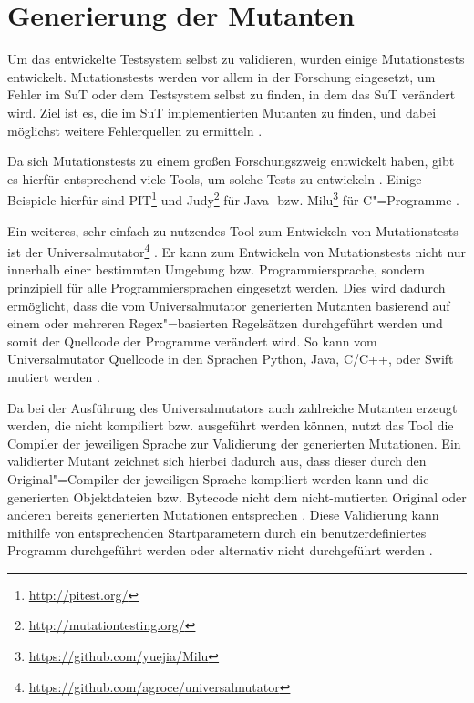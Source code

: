 \section{Generierung der Mutanten}
\label{sec:implMutationTests}

Um das entwickelte Testsystem selbst zu validieren, wurden einige Mutationstests entwickelt.
Mutationstests werden vor allem in der Forschung eingesetzt, um Fehler im \gls{SuT} oder dem Testsystem selbst zu finden, in dem das \gls{SuT} verändert wird.
Ziel ist es, die im \gls{SuT} implementierten Mutanten zu finden, und dabei möglichst weitere Fehlerquellen zu ermitteln \cite{DeMillo1978,Hamlet1977,Jia2011,Groce2018}.

Da sich Mutationstests zu einem großen Forschungszweig entwickelt haben, gibt es hierfür entsprechend viele Tools, um solche Tests zu entwickeln \cite{Jia2011,Groce2018}.
Einige Beispiele hierfür sind PIT\footnote{\url{http://pitest.org/}} und Judy\footnote{\url{http://mutationtesting.org/}} für Java- bzw. Milu\footnote{\url{https://github.com/yuejia/Milu}} für C"=Programme \cite{Coles2016,Madeyski2010,Jia2008}.

Ein weiteres, sehr einfach zu nutzendes Tool zum Entwickeln von Mutationstests ist der Universalmutator\footnote{\url{https://github.com/agroce/universalmutator}} \cite{Groce2018}.
Er kann zum Entwickeln von Mutationstests nicht nur innerhalb einer bestimmten Umgebung bzw. Programmiersprache, sondern prinzipiell für alle Programmiersprachen eingesetzt werden.
Dies wird dadurch ermöglicht, dass die vom Universalmutator generierten Mutanten basierend auf einem oder mehreren \gls{Regex}"=basierten Regelsätzen durchgeführt werden und somit der Quellcode der Programme verändert wird.
So kann vom Universalmutator Quellcode \uA in den Sprachen Python, Java, C/C++, oder Swift mutiert werden \cite{Groce2018}.

Da bei der Ausführung des Universalmutators auch zahlreiche Mutanten erzeugt werden, die nicht kompiliert bzw. ausgeführt werden können, nutzt das Tool die Compiler der jeweiligen Sprache zur Validierung der generierten Mutationen.
Ein validierter Mutant zeichnet sich hierbei dadurch aus, dass dieser durch den Original"=Compiler der jeweiligen Sprache kompiliert werden kann und die generierten Objektdateien bzw. Bytecode nicht dem nicht-mutierten Original oder anderen bereits generierten Mutationen entsprechen \cite{Groce2018}.
Diese Validierung kann mithilfe von entsprechenden Startparametern durch ein benutzerdefiniertes Programm durchgeführt werden oder alternativ nicht durchgeführt werden \cite{Groce2018,UniversalmutatorSourceGenmutants}.

